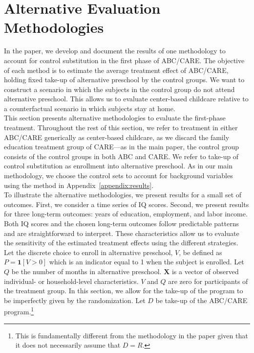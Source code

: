 \section{Alternative Evaluation Methodologies} \label{appendix:amethodology}

\noindent In the paper, we develop and document the results of one methodology to account for control substitution in the first phase of ABC/CARE. The objective of each method is to estimate the average treatment effect of ABC/CARE, holding fixed take-up of alternative preschool by the control groups. We want to construct a scenario in which the subjects in the control group do not attend alternative preschool. This allows us to evaluate center-based childcare relative to a counterfactual scenario in which subjects stay at home.\\

\noindent This section presents alternative methodologies to evaluate the first-phase treatment. Throughout the rest of this section, we refer to treatment in either ABC/CARE generically as center-based childcare, as we discard the family education treatment group of CARE---as in the main paper, the control group consists of the control groups in both ABC and CARE. We refer to take-up of control substitution as enrollment into alternative preschool. As in our main methodology, we choose the control sets to account for background variables using the method in Appendix~\ref{appendix:results}.\\

\noindent To illustrate the alternative methodologies, we present results for a small set of outcomes. First, we consider a time series of IQ scores. Second, we present results for three long-term outcomes: years of education, employment, and labor income. Both IQ scores and the chosen long-term outcomes follow predictable patterns and are straightforward to interpret. These characteristics allow us to evaluate the sensitivity of the estimated treatment effects using the different strategies.\\

\noindent Let the discrete choice to enroll in alternative preschool, $V$, be defined as $P=\mathbf{1}\left[V>0\right]$ which is an indicator equal to 1 when the subject is enrolled. Let $Q$ be the number of months in alternative preschool. $\mathbf{X}$ is a vector of observed individual- or household-level characteristics. $V$ and $Q$ are zero for participants of the treatment group. In this section, we allow for the take-up of the program to be imperfectly given by the randomization. Let $D$ be take-up of the ABC/CARE program.\footnote{This is fundamentally different from the methodology in the paper given that it does not necessarily assume that $D = R$.}

